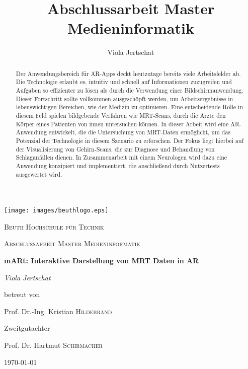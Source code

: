 \documentclass[a4paper,11pt]{report}
\title{Abschlussarbeit Master Medieninformatik}
\author{Viola Jertschat}
\let\oldcite\cite
\renewcommand*\cite[1]{[\oldcite{#1}]}
\begin{document}
\begin{titlepage}
	\centering
	\texttt{[image: images/beuthlogo.eps]}\par\vspace{1cm}
	{\scshape\LARGE Beuth Hochschule für Technik \par}
	\vspace{1cm}
	{\scshape\Large Abschlussarbeit Master Medieninformatik\par}
	\vspace{1.5cm}
	{\huge\bfseries mARt: Interaktive Darstellung von MRT Daten in AR\par}
	\vspace{2cm}
	{\Large\itshape Viola Jertschat\par}
	\vfill
	betreut von\par
	Prof. Dr.-Ing. Kristian \textsc{Hildebrand}
	
	\vfill
	Zweitgutachter\par
	Prof. Dr. Hartmut \textsc{Schirmacher}

	\vfill

	{\large \today\par}
\end{titlepage}

\begin{abstract} 
Der Anwendungsbereich für AR-Apps deckt heutzutage bereits viele Arbeitsfelder ab. Die Technologie erlaubt es, intuitiv und schnell auf Informationen zuzugreifen und Aufgaben so effizienter zu lösen als durch die Verwendung einer Bildschirmanwendung. Dieser Fortschritt sollte vollkommen ausgeschöpft werden, um Arbeitsergebnisse in lebenswichtigen Bereichen, wie der Medizin zu optimieren. 
Eine entscheidende Rolle in diesem Feld spielen bildgebende Verfahren wie MRT-Scans, durch die Ärzte den Körper eines Patienten von innen untersuchen können. 
In dieser Arbeit wird eine AR-Anwendung entwickelt, die die Untersuchung von MRT-Daten ermöglicht, um das Potenzial der Technologie in diesem Szenario zu erforschen. Der Fokus liegt hierbei auf der Visualisierung von Gehirn-Scans, die zur Diagnose und Behandlung von Schlaganfällen dienen. 
In Zusammenarbeit mit einem Neurologen wird dazu eine Anwendung konzipiert und implementiert, die anschließend durch Nutzertests ausgewertet wird.




\end{abstract}
\end{document}
